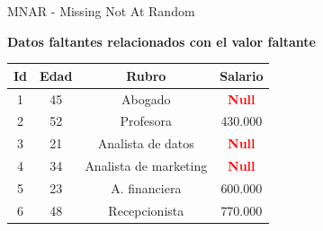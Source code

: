 \documentclass{beamer}
\begin{document}
\begin{frame}{MNAR - Missing Not At Random}
    \begin{center}
        \textbf{Datos faltantes relacionados con el valor faltante}
    \end{center}
    
    \vspace{0.3cm}
    
    \begin{center}
    \begin{tabular}{|c|c|c|c|}
    \hline
    \textbf{Id} & \textbf{Edad} & \textbf{Rubro} & \textbf{Salario} \\
    \hline
    1 & 45 & Abogado & \textcolor{red}{\textbf{Null}} \\
    \hline
    2 & 52 & Profesora & 430.000 \\
    \hline
    3 & 21 & Analista de datos & \textcolor{red}{\textbf{Null}} \\
    \hline
    4 & 34 & Analista de marketing & \textcolor{red}{\textbf{Null}} \\
    \hline
    5 & 23 & A. financiera & 600.000 \\
    \hline
    6 & 48 & Recepcionista & 770.000 \\
    \hline
    \end{tabular}
    \end{center}
    
    \vspace{0.3cm}
    
\end{frame}
\end{document}
